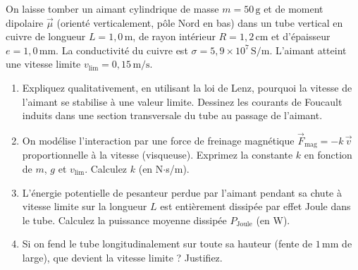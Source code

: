\documentclass[11pt]{article}
\begin{document}
\begin{exercice}
On laisse tomber un aimant cylindrique de masse $m = 50\,\text{g}$ et de moment dipolaire $\vec{\mu}$ (orienté verticalement, pôle Nord en bas) dans un tube vertical en cuivre de longueur $L = 1,0\,\text{m}$, de rayon intérieur $R = 1,2\,\text{cm}$ et d'épaisseur $e = 1,0\,\text{mm}$. La conductivité du cuivre est $\sigma = 5,9 \times 10^7\,\text{S/m}$. L'aimant atteint une vitesse limite $v_{\text{lim}} = 0,15\,\text{m/s}$.
\begin{enumerate}
    \item Expliquez qualitativement, en utilisant la loi de Lenz, pourquoi la vitesse de l'aimant se stabilise à une valeur limite. Dessinez les courants de Foucault induits dans une section transversale du tube au passage de l'aimant.
    \item On modélise l'interaction par une force de freinage magnétique $\vec{F}_{\text{mag}} = -k\,\vec{v}$ proportionnelle à la vitesse (visqueuse). Exprimez la constante $k$ en fonction de $m$, $g$ et $v_{\text{lim}}$. Calculez $k$ (en N$\cdot$s/m).
    \item L'énergie potentielle de pesanteur perdue par l'aimant pendant sa chute à vitesse limite sur la longueur $L$ est entièrement dissipée par effet Joule dans le tube. Calculez la puissance moyenne dissipée $P_{\text{Joule}}$ (en W).
    \item Si on fend le tube longitudinalement sur toute sa hauteur (fente de $1\,\text{mm}$ de large), que devient la vitesse limite ? Justifiez.
\end{enumerate}
\end{exercice}
\end{document}
